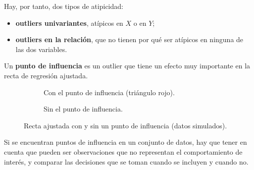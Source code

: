 Hay, por tanto, dos tipos de atipicidad:
\begin{itemize}
  \item \textbf{outliers univariantes}, atípicos en $X$ o en $Y$;
  \item \textbf{outliers en la relación}, que no tienen por qué ser atípicos en ninguna de las
    dos variables.
\end{itemize}

\begin{definicion}
  Un \textbf{punto de influencia} es un outlier que tiene un efecto muy importante en la recta de
  regresión ajustada.
\end{definicion}

\begin{figure}[H]
  \centering
  \begin{subfigure}[t]{0.45\linewidth}
    \centering
    \caption{Con el punto de influencia (triángulo rojo).}
  \end{subfigure}\hfill
  \begin{subfigure}[t]{0.45\linewidth}
    \centering
    \caption{Sin el punto de influencia.}
  \end{subfigure}
  \caption{Recta ajustada con y sin un punto de influencia (datos simulados).}
\end{figure}

Si se encuentran puntos de influencia en un conjunto de datos, hay que tener en cuenta que pueden
ser observaciones que no representan el comportamiento de interés, y comparar las decisiones que
se toman cuando se incluyen y cuando no.

